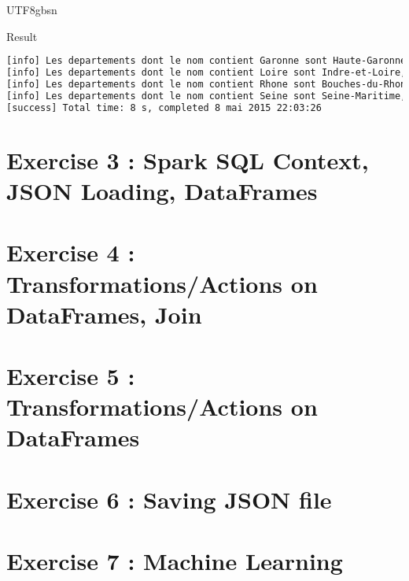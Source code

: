 \documentclass[slidetop,9pt,utf8]{beamer}
\begin{document}
\begin{CJK}{UTF8}{gbsn}
\begin{frame}[fragile]
  \begin{block}{Result}
    \begin{lstlisting}[language=bash, style=terminal]
[info] Les departements dont le nom contient Garonne sont Haute-Garonne, Lot-et-Garonne, Tarn-et-Garonne
[info] Les departements dont le nom contient Loire sont Indre-et-Loire, Loire, Haute-Loire, Loire-Atlantique, Loiret, Maine-et-Loire, Saone-et-Loire
[info] Les departements dont le nom contient Rhone sont Bouches-du-Rhone, Rhone
[info] Les departements dont le nom contient Seine sont Seine-Maritime, Seine-et-Marne, Hauts-de-Seine, Seine-Saint-Denis
[success] Total time: 8 s, completed 8 mai 2015 22:03:26
    \end{lstlisting}
  \end{block}

\end{frame}

\section{Exercise 3 : Spark SQL Context, JSON Loading, DataFrames}
\section{Exercise 4 : Transformations/Actions on DataFrames, Join}
\section{Exercise 5 : Transformations/Actions on DataFrames}
\section{Exercise 6 : Saving JSON file}
\section{Exercise 7 : Machine Learning}


\end{CJK}
\end{document}
